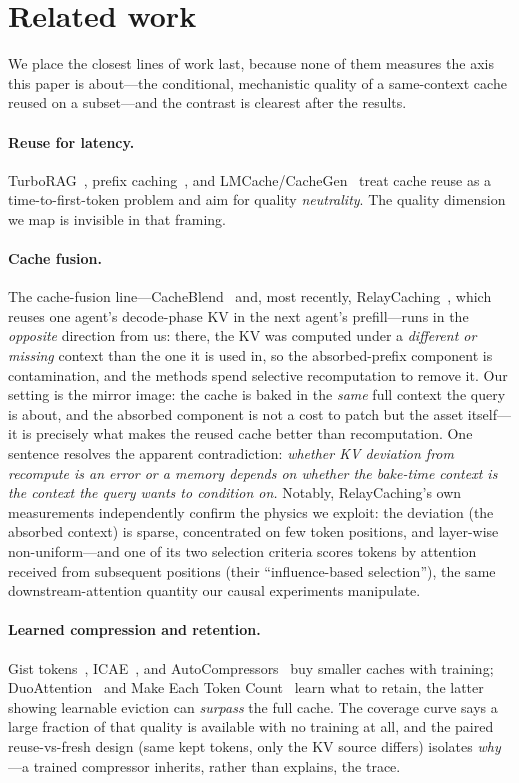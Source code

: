 \documentclass[11pt]{article}
\begin{document}
\section{Related work}
\label{sec:related}

We place the closest lines of work last, because none of them measures the axis this paper is about---the conditional, mechanistic quality of a same-context cache reused on a subset---and the contrast is clearest after the results.

\paragraph{Reuse for latency.}
TurboRAG~\cite{turborag}, prefix caching~\cite{vllm}, and LMCache/CacheGen~\cite{cachegen} treat cache reuse as a time-to-first-token problem and aim for quality \emph{neutrality}. The quality dimension we map is invisible in that framing.

\paragraph{Cache fusion.}
The cache-fusion line---CacheBlend~\cite{cacheblend} and, most recently, RelayCaching~\cite{relaycaching}, which reuses one agent's decode-phase KV in the next agent's prefill---runs in the \emph{opposite} direction from us: there, the KV was computed under a \emph{different or missing} context than the one it is used in, so the absorbed-prefix component is contamination, and the methods spend selective recomputation to remove it. Our setting is the mirror image: the cache is baked in the \emph{same} full context the query is about, and the absorbed component is not a cost to patch but the asset itself---it is precisely what makes the reused cache better than recomputation. One sentence resolves the apparent contradiction: \emph{whether KV deviation from recompute is an error or a memory depends on whether the bake-time context is the context the query wants to condition on.} Notably, RelayCaching's own measurements independently confirm the physics we exploit: the deviation (the absorbed context) is sparse, concentrated on few token positions, and layer-wise non-uniform---and one of its two selection criteria scores tokens by attention received from subsequent positions (their ``influence-based selection''), the same downstream-attention quantity our causal experiments manipulate.

\paragraph{Learned compression and retention.}
Gist tokens~\cite{gist}, ICAE~\cite{icae}, and AutoCompressors~\cite{autocompressors} buy smaller caches with training; DuoAttention~\cite{duoattention} and Make Each Token Count~\cite{maketokencount} learn what to retain, the latter showing learnable eviction can \emph{surpass} the full cache. The coverage curve says a large fraction of that quality is available with no training at all, and the paired reuse-vs-fresh design (same kept tokens, only the KV source differs) isolates \emph{why}---a trained compressor inherits, rather than explains, the trace.
\end{document}
